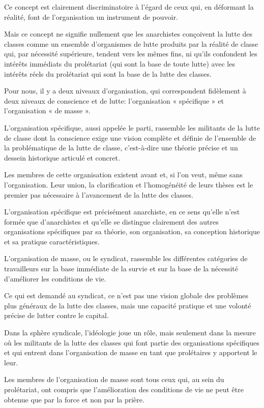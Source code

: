 Ce concept est clairement discriminatoire à l'égard de ceux qui, en déformant la réalité, font de l'organisation un instrument de pouvoir.

Mais ce concept ne signifie nullement que les anarchistes conçoivent la lutte des classes comme un ensemble d'organismes de lutte produits par la réalité de classe qui, par nécessité supérieure, tendent vers les mêmes fins, ni qu'ils confondent les intérêts immédiats du prolétariat (qui sont la base de toute lutte) avec les intérêts réels du prolétariat qui sont la base de la lutte des classes.

Pour nous, il y a deux niveaux d'organisation, qui correspondent fidèlement à deux niveaux de conscience et de lutte: l'organisation « spécifique » et l'organisation « de masse ».

L'organisation spécifique, aussi appelée le parti, rassemble les militants de la lutte de classe dont la conscience exige une vision complète et définie de l'ensemble de la problématique de la lutte de classe, c'est-à-dire une théorie précise et un dessein historique articulé et concret.

Les membres de cette organisation existent avant et, si l'on veut, même sans l'organisation. Leur union, la clarification et l'homogénéité de leurs thèses est le premier pas nécessaire à l'avancement de la lutte des classes.

L'organisation spécifique  est précisément anarchiste, en ce sens qu'elle n'est formée que d'anarchistes et qu'elle se distingue clairement des autres organisations spécifiques  par sa théorie, son organisation, sa conception historique et sa pratique caractéristiques.

L'organisation de masse, ou le syndicat, rassemble les différentes catégories de travailleurs sur la base immédiate de la survie et sur la base de la nécessité d'améliorer les conditions de vie.

Ce qui est demandé au syndicat, ce n'est pas une vision globale des problèmes plus généraux de la lutte des classes, mais une capacité pratique et une volonté précise de lutter contre le capital.

Dans la sphère syndicale, l'idéologie joue un rôle, mais seulement dans la mesure où les militants de la lutte des classes qui font partie des organisations spécifiques et qui entrent dans l'organisation de masse en tant que prolétaires y apportent le leur.

Les membres de l'organisation de masse sont tous ceux qui, au sein du prolétariat, ont compris que l'amélioration des conditions de vie ne peut être obtenue que par la force et non par la prière.

